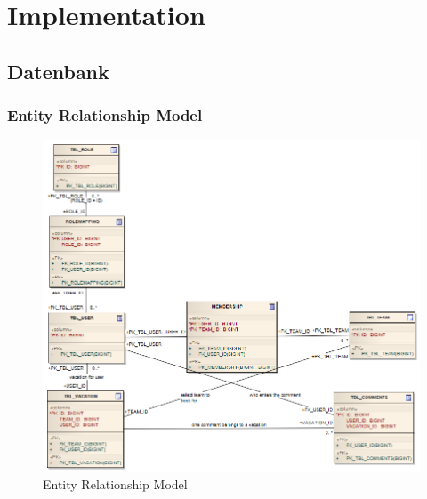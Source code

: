 \chapter{Implementation}
\section{Datenbank}
\subsection{Entity Relationship Model}

\begin{landscape}
\begin{figure}
  \centering
        \caption{Entity Relationship Model}
    \includegraphics[width=17cm]{images/erm}
\end{figure}
	\end{landscape}